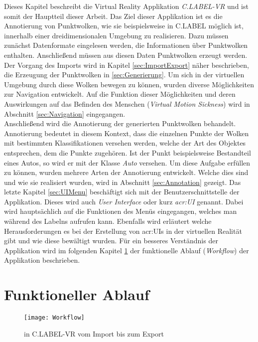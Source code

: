 \graphicspath{{Kapitel/Kapitel4_Hauptteil/Images/}}

Dieses Kapitel beschreibt die Virtual Reality Applikation \textit{C.LABEL-VR} und ist somit der Hauptteil dieser Arbeit. Das Ziel dieser Applikation ist es die Annotierung von Punktwolken, wie sie beispielsweise in C.LABEL möglich ist, innerhalb einer dreidimensionalen Umgebung zu realisieren. Dazu müssen zunächst Datenformate eingelesen werden, die Informationen über Punktwolken enthalten. Anschließend müssen aus diesen Daten Punktwolken erzeugt werden. Der Vorgang des Imports wird in Kapitel \ref{sec:ImportExport} näher beschrieben, die Erzeugung der Punktwolken in \ref{sec:Generierung}. Um sich in der virtuellen Umgebung durch diese Wolken bewegen zu können, wurden diverse Möglichkeiten zur Navigation entwickelt. Auf die Funktion dieser Möglichkeiten und deren Auswirkungen auf das Befinden des Menschen (\textit{Virtual Motion Sickness}) wird in Abschnitt \ref{sec:Navigation} eingegangen.\\

Anschließend wird die Annotierung der generierten Punktwolken behandelt. Annotierung bedeutet in diesem Kontext, dass die einzelnen Punkte der Wolken mit bestimmten Klassifikationen versehen werden, welche der Art des Objektes entsprechen, dem die Punkte zugehören. Ist der Punkt beispielsweise Bestandteil eines Autos, so wird er mit der Klasse \textit{Auto} versehen. Um diese Aufgabe erfüllen zu können, wurden mehrere Arten der Annotierung entwickelt. Welche dies sind und wie sie realisiert wurden, wird in Abschnitt \ref{sec:Annotation} gezeigt. Das letzte Kapitel \ref{sec:UIMenu} beschäftigt sich mit der Benutzerschnittstelle der Applikation. Dieses wird auch \textit{User Interface} oder kurz \textit{\acrshort{acr:UI}} genannt. Dabei wird hauptsächlich auf die Funktionen des Menüs eingegangen, welches man während des Labelns aufrufen kann. Ebenfalls wird erläutert welche Herausforderungen es bei der Erstellung von \acrshort{acr:UI}s in der virtuellen Realität gibt und wie diese bewältigt wurden. Für ein besseres Verständnis der Applikation wird im folgenden Kapitel \ref{sec:Workflow} der funktionelle Ablauf (\textit{Workflow}) der Applikation beschrieben.


\section{Funktioneller Ablauf}
\label{sec:Workflow}

\begin{figure}%
	\centering
    \texttt{[image: Workflow]}
    \caption{ in C.LABEL-VR vom Import bis zum Export}
    \label{fig:Workflow}
\end{figure}



